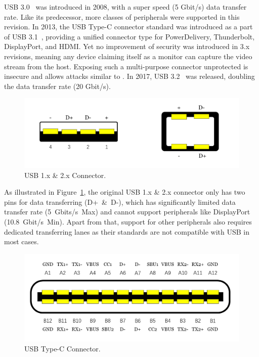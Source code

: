 \ac{USB} 3.0~\cite{usb30} was introduced in 2008, with a super speed (5 Gbit/s) data
transfer rate. Like its predecessor, more classes of peripherals were supported
in this revision. In 2013, the \ac{USB} Type-C connector standard was introduced as a
part of \ac{USB} 3.1~\cite{usb31}, providing a unified connector type for
PowerDelivery, Thunderbolt, DisplayPort, and HDMI.  Yet no improvement of
security was introduced in 3.x revisions, meaning any device claiming
itself as a monitor can capture the video stream from the host. Exposing
such a multi-purpose connector unprotected is insecure and allows attacks similar to \tool. In 2017, \ac{USB} 3.2~\cite{usb32} was released, doubling the data
transfer rate (20 Gbit/s).

\begin{figure}[t]
    \centering
	\includegraphics[width=0.7\linewidth]{./Figs/usb_conn.png}
	\caption{\ac{USB} 1.x \& 2.x Connector.}
	\label{fig:usb_conn}
\end{figure}

As illustrated in Figure~\ref{fig:usb_conn}, the original \ac{USB} 1.x \& 2.x
connector only has two pins for data transferring \mbox{(D+ \& D-)}, which has
significantly limited data transfer rate \mbox{(5 Gbits/s Max)} and cannot support
peripherals like DisplayPort \mbox{(10.8 Gbit/s Min)}. Apart from that, support for
other peripherals also requires dedicated transferring lanes as their standards
are not compatible with \ac{USB} in most cases.  

\begin{figure}[t] 
	\centering
	\includegraphics[width=\linewidth]{./Figs/usb_c_conn.png} 
	\caption{\ac{USB} Type-C Connector.} 
	\label{fig:usb_c_conn} 
\end{figure}

